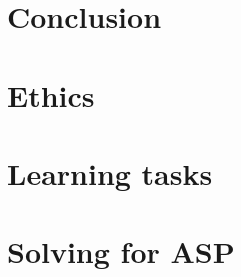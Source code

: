 \documentclass[12pt,twoside]{report}
\theoremstyle{plain}
\theoremstyle{definition}
\begin{document}
\chapter{Conclusion}
\label{conclusion}


\newpage



\newpage
\appendix
\chapter{Ethics}



\newpage
\chapter{Learning tasks}


\newpage
\chapter{Solving for ASP}

\end{document}
